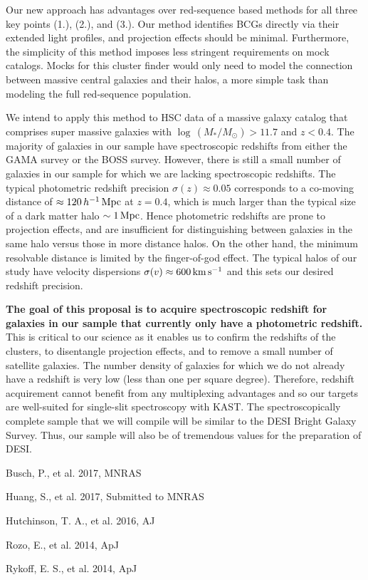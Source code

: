 \documentclass[letterpaper,12pt]{article}
\newenvironment{my_itemize}{
\begin{itemize}
  \setlength{\itemsep}{1pt}
  \setlength{\parskip}{0pt}
  \setlength{\parsep}{0pt}}{\end{itemize}
}
\begin{document}
Our new approach has advantages over red-sequence based methods for all three key points (1.), (2.), and (3.). Our
method identifies BCGs directly via their extended light profiles, and projection effects should be minimal.
Furthermore, the simplicity of this method imposes less stringent requirements on mock catalogs. Mocks for this cluster
finder would only need to model the connection between massive central galaxies and their halos, a more simple task
than modeling the full red-sequence population.

We intend to apply this method to HSC data of a massive galaxy catalog that comprises super massive galaxies with
$\log\,(M_*/M_\odot)>11.7$ and $z<0.4$. The majority of galaxies in our sample have spectroscopic redshifts from
either the GAMA survey or the BOSS survey. However, there is still a small number of galaxies in our sample for which
we are lacking spectroscopic redshifts. The typical photometric redshift precision $\sigma(z)\approx0.05$ corresponds
to a co-moving distance of $\approx120\,h^{-1}\,{\rm Mpc}$ at $z=0.4$, which is much larger than the typical size of a
dark matter halo $\sim1\,{\rm Mpc}$. Hence photometric redshifts are prone to projection effects, and are insufficient
for distinguishing between galaxies in the same halo versus those in more distance halos. On the other hand, the
minimum resolvable distance is limited by the finger-of-god effect. The typical halos of our study have velocity
dispersions $\sigma(v)\approx600\,{\rm km\,s^{-1}}$ and this sets our desired redshift precision.

\textbf{The goal of this proposal is to acquire spectroscopic redshift for galaxies in
our sample that currently only have a photometric redshift.} This is critical to our science as it enables
us to confirm the redshifts of the clusters, to disentangle projection effects, and to remove a small number of
satellite galaxies. The number density of galaxies for which we do not already have a redshift is very low (less than
one per square degree). Therefore, redshift acquirement cannot benefit from any multiplexing advantages and so our
targets are well-suited for single-slit spectroscopy with KAST. The spectroscopically complete sample that we will
compile will be similar to the DESI Bright Galaxy Survey. Thus, our sample will also be of tremendous values for the
preparation of DESI.

\clearpage

\vspace{-0.25in}
\begin{my_itemize}
\item Busch, P., et al. 2017, MNRAS
\item Huang, S., et al. 2017, Submitted to MNRAS
\item Hutchinson, T. A., et al. 2016, AJ
\item Rozo, E., et al. 2014, ApJ
\item Rykoff, E. S., et al. 2014, ApJ
\end{my_itemize}
\end{document}

